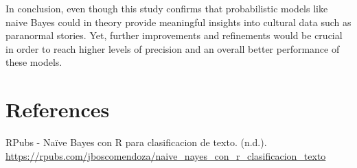 \documentclass[twocolumn]{article}
\begin{document}
In conclusion, even though this study confirms that probabilistic models like naive Bayes could in theory provide meaningful insights into cultural data such as paranormal stories. Yet, further improvements and refinements would be crucial in order to reach higher levels of precision and an overall better performance of these models.



\section{References}

\begin{thebibliography}{9}
\setlength{\itemsep}{0pt}
\setlength{\parskip}{0pt}


RPubs - Naïve Bayes con R para clasificacion de texto. (n.d.).
\url{https://rpubs.com/jboscomendoza/naive_nayes_con_r_clasificacion_texto}

\vspace{0.3cm}


\end{thebibliography}
\end{document}
